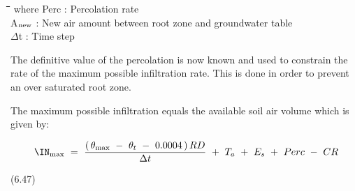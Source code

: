 \documentclass[11pt]{article}
\begin{document}
\nwln
\begin{tabbing}
\hspace{1.27cm}\=\hspace{1.27cm}\=\hspace{1.27cm}\=\hspace{1.27cm}\=%
\hspace{1.27cm}\=\hspace{1.27cm}\=\hspace{1.27cm}\=\hspace{1.27cm}\=%
\hspace{1.27cm}\=\hspace{1.27cm}\=\kill
where\> Perc\> : Percolation rate \> \> \> \> \> \> \> \> [cm d$^{{\rm -1}}$]\\
\>A$_{{\rm new}}$\> : New air amount between root zone and groundwater table\> \> \> \> \> \> \> \> [cm]\\
\>$\Delta$t\> : Time step\> \> \> \> \> \> \> \> [d]
\end{tabbing}

\bigskip
The definitive value of the percolation is now known and used to constrain the rate of the
maximum possible infiltra\-tion rate. This is done in order to prevent an over saturated root
zone.

\bigskip
\bigskip
\bigskip
\bigskip
\bigskip
\bigskip
\bigskip
\bigskip
The maximum possible infiltration equals the available soil air volume which is given by:

\begin{displaymath}
\IN _{\max } ~=~{\frac{(\, \theta _{\max } ~-~ \theta _{t} ~-~ 0.0004\, )\, RD}{\Delta t}} ~+~ T _{a} ~+~ E _{s} ~+~ Perc ~-~ CR
\end{displaymath}

 \bigskip
\strut\hfill (6.47)
\end{document}
